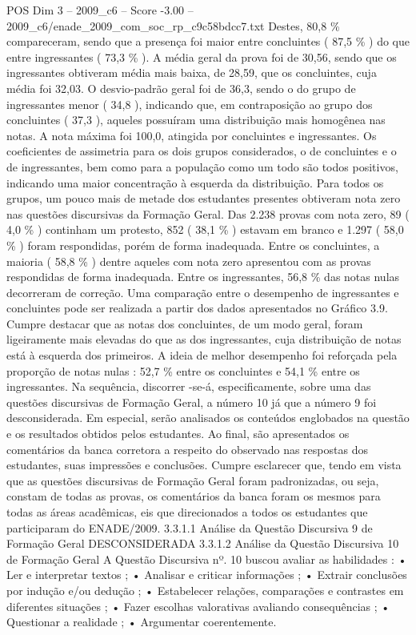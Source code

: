 \begin{textsample}{POS Dim 3 – 2009\_c6 – Score -3.00 – 2009\_c6/enade\_2009\_com\_soc\_rp\_c9c58bdcc7.txt}
Destes, 80,8 \% compareceram, sendo que a presença foi maior entre concluintes ( 87,5 \% ) do que entre ingressantes ( 73,3 \% ).
A média geral da prova foi de 30,56, sendo que os ingressantes obtiveram média mais baixa, de 28,59, que os concluintes, cuja média foi 32,03.
O desvio-padrão geral foi de 36,3, sendo o do grupo de ingressantes menor ( 34,8 ), indicando que, em contraposição ao grupo dos concluintes ( 37,3 ), aqueles possuíram uma distribuição mais homogênea nas notas.
A nota máxima foi 100,0, atingida por concluintes e ingressantes.
Os coeficientes de assimetria para os dois grupos considerados, o de concluintes e o de ingressantes, bem como para a população como um todo são todos positivos, indicando uma maior concentração à esquerda da distribuição.
Para todos os grupos, um pouco mais de metade dos estudantes presentes obtiveram nota zero nas questões discursivas da Formação Geral.
Das 2.238 provas com nota zero, 89 ( 4,0 \% ) continham um protesto, 852 ( 38,1 \% ) estavam em branco e 1.297 ( 58,0 \% ) foram respondidas, porém de forma inadequada.
Entre os concluintes, a maioria ( 58,8 \% ) dentre aqueles com nota zero apresentou com as provas respondidas de forma inadequada.
Entre os ingressantes, 56,8 \% das notas nulas decorreram de correção.
Uma comparação entre o desempenho de ingressantes e concluintes pode ser realizada a partir dos dados apresentados no Gráfico 3.9.
Cumpre destacar que as notas dos concluintes, de um modo geral, foram ligeiramente mais elevadas do que as dos ingressantes, cuja distribuição de notas está à esquerda dos primeiros.
A ideia de melhor desempenho foi reforçada pela proporção de notas nulas : 52,7 \% entre os concluintes e 54,1 \% entre os ingressantes.
Na sequência, discorrer -se-á, especificamente, sobre uma das questões discursivas de Formação Geral, a número 10 já que a número 9 foi desconsiderada.
Em especial, serão analisados os conteúdos englobados na questão e os resultados obtidos pelos estudantes.
Ao final, são apresentados os comentários da banca corretora a respeito do observado nas respostas dos estudantes, suas impressões e conclusões.
Cumpre esclarecer que, tendo em vista que as questões discursivas de Formação Geral foram padronizadas, ou seja, constam de todas as provas, os comentários da banca foram os mesmos para todas as áreas acadêmicas, eis que direcionados a todos os estudantes que participaram do ENADE/2009. 3.3.1.1 Análise da Questão Discursiva 9 de Formação Geral DESCONSIDERADA 3.3.1.2 Análise da Questão Discursiva 10 de Formação Geral A Questão Discursiva nº. 10 buscou avaliar as habilidades : • Ler e interpretar textos ; • Analisar e criticar informações ; • Extrair conclusões por indução e/ou dedução ; • Estabelecer relações, comparações e contrastes em diferentes situações ; • Fazer escolhas valorativas avaliando consequências ; • Questionar a realidade ; • Argumentar coerentemente.

\end{textsample}

